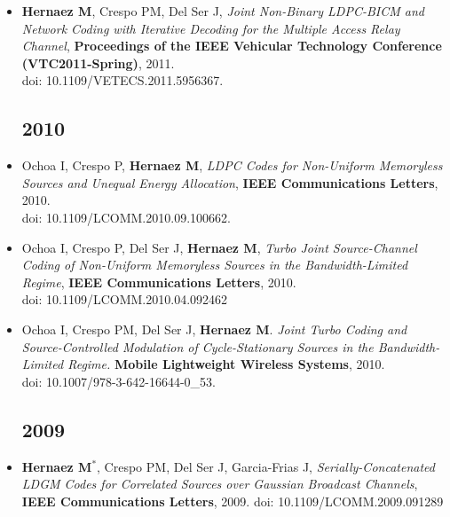 \documentclass[11pt,a4paper,sans]{moderncv}        %
\begin{document}
\begin{itemize}
\item \textbf{Hernaez M}, Crespo PM, {Del Ser} J, \textsl{Joint Non-Binary LDPC-BICM and Network Coding with Iterative Decoding for the Multiple Access Relay Channel}, \textbf{Proceedings of the IEEE Vehicular Technology Conference (VTC2011-Spring)}, 2011. \\
doi: 10.1109/VETECS.2011.5956367.\\

\subsection{2010}
\vspace{6pt}

\item Ochoa I, Crespo P, \textbf{Hernaez M}, \textsl{LDPC Codes for Non-Uniform Memoryless Sources and Unequal Energy Allocation}, \textbf{IEEE Communications Letters}, 2010.\\
doi: 10.1109/LCOMM.2010.09.100662.\\

\item Ochoa I, Crespo P, {Del Ser} J,  \textbf{Hernaez M}, \textsl{Turbo Joint Source-Channel Coding of Non-Uniform Memoryless Sources in the Bandwidth-Limited Regime}, \textbf{IEEE Communications Letters}, 2010.\\
doi: 10.1109/LCOMM.2010.04.092462\\

\item Ochoa I, Crespo PM, Del Ser J, \textbf{Hernaez M}. \textsl{Joint Turbo Coding and Source-Controlled Modulation of Cycle-Stationary Sources in the Bandwidth-Limited Regime.} \textbf{Mobile Lightweight Wireless Systems}, 2010.\\
doi: 10.1007/978-3-642-16644-0\_53.\\

\subsection{2009}
\vspace{6pt}

\item \textbf{Hernaez M}$^\ast$, Crespo PM, {Del Ser} J, Garcia-Frias J, \textsl{ Serially-Concatenated LDGM Codes for Correlated Sources over Gaussian Broadcast Channels}, \textbf{IEEE Communications Letters}, 2009.
doi: 10.1109/LCOMM.2009.091289\\


\end{itemize}
\end{document}
